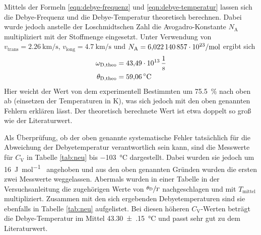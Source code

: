 Mittels der Formeln
\eqref{eqn:debye-frequenz} und \eqref{eqn:debye-temperatur}
lassen sich die Debye-Frequenz und die Debye-Temperatur theoretisch
berechnen. Dabei wurde jedoch anstelle der Loschmidtschen Zahl die
Avogadro-Konstante $N_\text{A}$ multipliziert mit der Stoffmenge eingesetzt.
Unter Verwendung von
$v_\text{trans}=\SI{2.26}{\kilo\meter\per\second}$,
$v_\text{long}=\SI{4.7}{\kilo\meter\per\second}$ \cite[p.~5]{anleitung}
und $N_\text{A}=\SI{6.022140857e+23}{\raiseto{-1}\mole}$ \cite{scipy}
ergibt sich
\begin{align*}
    \omega_\text{D,theo} &= \SI{43.49e13}{\raiseto{-1}\second} \\
    \theta_\text{D,theo} &= \SI{59.06}{\celsius}
\end{align*}
Hier weicht der Wert von dem experimentell Bestimmten um \SI{75.5}{\percent}
nach oben ab (einsetzen der Temperaturen in \si{\kelvin}),
was sich jedoch mit den oben genannten Fehlern erklären lässt.
Der theoretisch berechnete Wert ist etwa doppelt so groß wie der Literaturwert.

Als Überprüfung, ob der oben genannte systematische Fehler tatsächlich für
die Abweichung der Debyetemperatur verantwortlich sein kann, sind die
Messwerte für $C_\text{V}$ in Tabelle \ref{tab:neu} bis \SI{-103}{\celsius}
dargestellt. Dabei wurden sie jedoch um \SI{16}{\joule\per\mole\grd}
angehoben und aus den oben genannten Gründen wurden die ersten zwei Messwerte
weggelassen. Abermals wurden in einer Tabelle in der Versuchsanleitung
\cite[p.~5]{anleitung} die zugehörigen Werte von $\sfrac{\theta_\text{D}}{T}$
nachgeschlagen und mit $T_\text{mittel}$ multipliziert. Zusammen mit den
sich ergebenden Debyetemperaturen sind sie ebenfalls in Tabelle \ref{tab:neu}
aufgelistet. Bei diesen höheren $C_\text{V}$-Werten beträgt die
Debye-Temperatur im Mittel \SI{43.30(15)}{\celsius} und passt sehr gut zu
dem Literaturwert.


